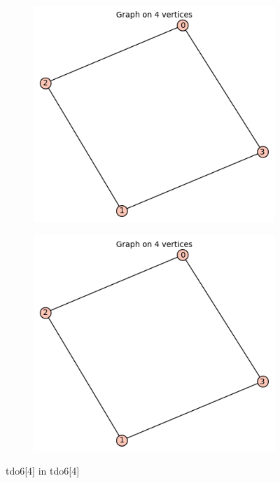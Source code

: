 \documentclass[12pt, a4paper]{article}
\begin{document}
\begin{center}
\begin{figure}[!htb]
\centering
\begin{subfigure}{0.5\textwidth}
  \centering
  \includegraphics[width=0.5\linewidth]{tdo6[4]}
\end{subfigure}%
\begin{subfigure}{0.5\textwidth}
  \centering
  \includegraphics[width=0.5\linewidth]{tdo6[4]}
\end{subfigure}
\caption{tdo6[4] in tdo6[4]}
\label{fig:test}
\end{figure}


\end{center}
\end{document}
